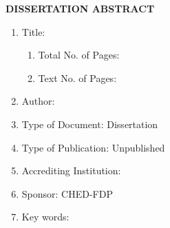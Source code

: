\newpage
\thispagestyle{empty}

\begin{center}
\textbf{DISSERTATION ABSTRACT}
\end{center}

\begin{enumerate}[leftmargin=0em, itemindent=1.8em]
\item Title: \begin{minipage}[t]{0.75\textwidth} \vspace{-1.9em}\vspace{0.7em}
\end{minipage}

\begin{enumerate}[leftmargin=1.5em,label*=\arabic*.]

\item Total No. of Pages: \ifnotUCFormat  {} \fi	%
\item Text No. of Pages: \ifnotUCFormat   {} %
							\fi

\end{enumerate}


\item Author: \MakeUppercase{\FullNameFamilyFirst}

\item Type of Document: Dissertation

\item Type of Publication: Unpublished

\item Accrediting Institution: \begin{minipage}[t]{0.5\textwidth} \vspace{-1.9em}\vspace{0.5em}
\end{minipage}

\item Sponsor: CHED-FDP

\item Key words: \begin{minipage}[t]{0.7\textwidth} \vspace{-1.9em}\singlespacing{\Keywords}\vspace{0.5em}\end{minipage}


\end{enumerate}

